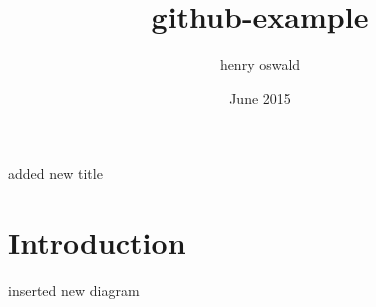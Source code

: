\documentclass{article}
\title{github-example}
\author{henry oswald}
\date{June 2015}
\begin{document}
\maketitle
added new title
\section{Introduction}
inserted new diagram
\end{document}
